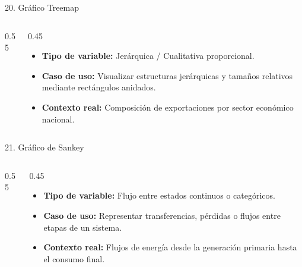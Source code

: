 \documentclass[aspectratio=169,10pt]{beamer}
\begin{document}
\begin{frame}{20. Gráfico Treemap}
\begin{columns}
\begin{column}{0.55\textwidth}
\end{column}
\begin{column}{0.45\textwidth}
\begin{itemize}\small
\item \textbf{Tipo de variable:} Jerárquica / Cualitativa proporcional.
\item \textbf{Caso de uso:} Visualizar estructuras jerárquicas y tamaños relativos mediante rectángulos anidados.
\item \textbf{Contexto real:} Composición de exportaciones por sector económico nacional.
\end{itemize}
\end{column}
\end{columns}
\end{frame}

\begin{frame}{21. Gráfico de Sankey}
\begin{columns}
\begin{column}{0.55\textwidth}
\end{column}
\begin{column}{0.45\textwidth}
\begin{itemize}\small
\item \textbf{Tipo de variable:} Flujo entre estados continuos o categóricos.
\item \textbf{Caso de uso:} Representar transferencias, pérdidas o flujos entre etapas de un sistema.
\item \textbf{Contexto real:} Flujos de energía desde la generación primaria hasta el consumo final.
\end{itemize}
\end{column}
\end{columns}
\end{frame}
\end{document}
